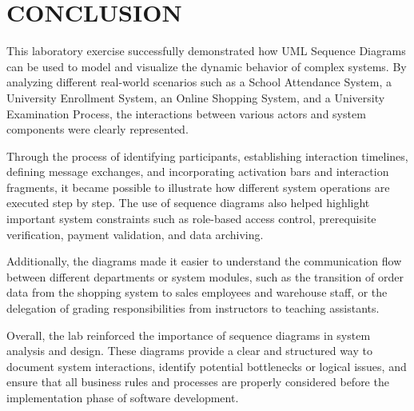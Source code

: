 \chapter{CONCLUSION}
\label{ch:conclusion}

This laboratory exercise successfully demonstrated how UML Sequence Diagrams can be used to model and visualize the dynamic behavior of complex systems. By analyzing different real-world scenarios such as a School Attendance System, a University Enrollment System, an Online Shopping System, and a University Examination Process, the interactions between various actors and system components were clearly represented.

Through the process of identifying participants, establishing interaction timelines, defining message exchanges, and incorporating activation bars and interaction fragments, it became possible to illustrate how different system operations are executed step by step. The use of sequence diagrams also helped highlight important system constraints such as role-based access control, prerequisite verification, payment validation, and data archiving.

Additionally, the diagrams made it easier to understand the communication flow between different departments or system modules, such as the transition of order data from the shopping system to sales employees and warehouse staff, or the delegation of grading responsibilities from instructors to teaching assistants.

Overall, the lab reinforced the importance of sequence diagrams in system analysis and design. These diagrams provide a clear and structured way to document system interactions, identify potential bottlenecks or logical issues, and ensure that all business rules and processes are properly considered before the implementation phase of software development.

\clearpage